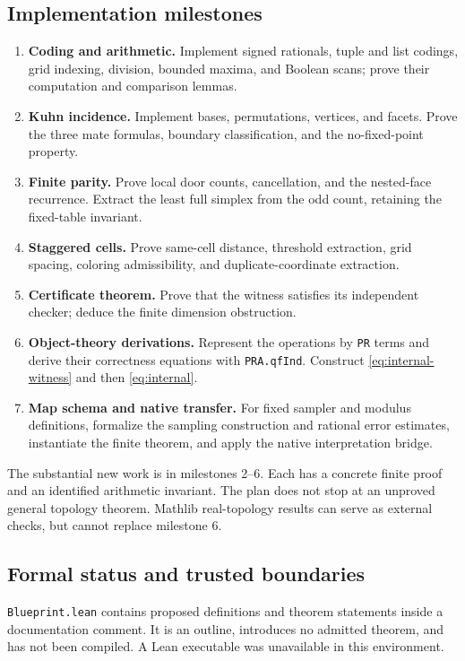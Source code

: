 \documentclass[11pt,a4paper]{article}
\theoremstyle{definition}
\begin{document}
\subsection{Implementation milestones}
\begin{enumerate}
\item \textbf{Coding and arithmetic.}
Implement signed rationals, tuple and list codings,
grid indexing, division, bounded maxima, and Boolean scans;
prove their computation and comparison lemmas.
\item \textbf{Kuhn incidence.}
Implement bases, permutations, vertices, and facets.
Prove the three mate formulas, boundary classification,
and the no-fixed-point property.
\item \textbf{Finite parity.}
Prove local door counts, cancellation, and the
nested-face recurrence. Extract the least full simplex
from the odd count, retaining the fixed-table invariant.
\item \textbf{Staggered cells.}
Prove same-cell distance, threshold extraction, grid
spacing, coloring admissibility, and duplicate-coordinate
extraction.
\item \textbf{Certificate theorem.}
Prove that the witness satisfies its independent checker;
deduce the finite dimension obstruction.
\item \textbf{Object-theory derivations.}
Represent the operations by \texttt{PR} terms and derive
their correctness equations with \texttt{PRA.qfInd}.
Construct \eqref{eq:internal-witness} and then
\eqref{eq:internal}.
\item \textbf{Map schema and native transfer.}
For fixed sampler and modulus definitions, formalize
the sampling construction and rational error estimates,
instantiate the finite theorem, and apply the native
interpretation bridge.
\end{enumerate}
The substantial new work is in milestones 2--6. Each has
a concrete finite proof and an identified arithmetic
invariant. The plan does not stop at an unproved general
topology theorem. Mathlib real-topology results can serve
as external checks, but cannot replace milestone 6.

\subsection{Formal status and trusted boundaries}
\texttt{Blueprint.lean} contains proposed definitions
and theorem statements inside a documentation comment.
It is an outline, introduces no admitted theorem, and
has not been compiled. A Lean executable was unavailable
in this environment.
\end{document}
